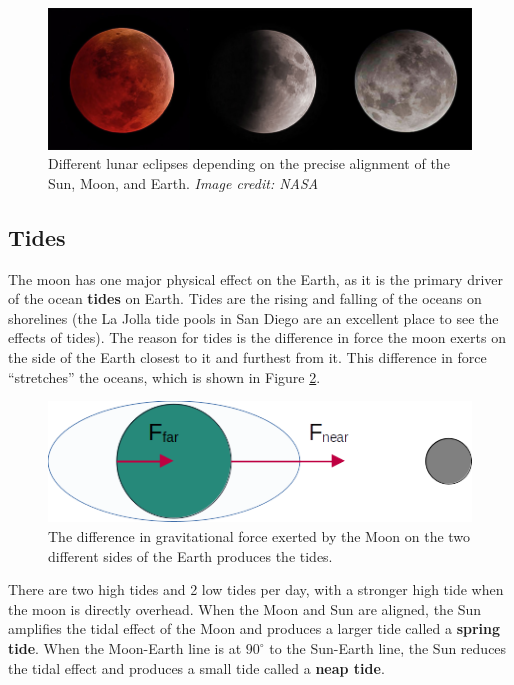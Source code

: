 \documentclass[12pt]{book}
\begin{document}
\begin{figure}[t]
\centering
\includegraphics[scale=0.4]{lunar_eclipse.jpg}
\caption{Different lunar eclipses depending on the precise alignment of the Sun, Moon, and Earth. \textit{Image credit: NASA}}
\label{lunareclipse}
\end{figure}

\subsection{Tides}

The moon has one major physical effect on the Earth, as it is the primary driver of the ocean \textbf{tides} on Earth. Tides are the rising and falling of the oceans on shorelines (the La Jolla tide pools in San Diego are an excellent place to see the effects of tides). The reason for tides is the difference in force the moon exerts on the side of the Earth closest to it and furthest from it. This difference in force ``stretches'' the oceans, which is shown in Figure \ref{tides}.

\begin{figure}[H]
\centering
\includegraphics[scale=0.6]{tides.png}
\caption{The difference in gravitational force exerted by the Moon on the two different sides of the Earth produces the tides.}
\label{tides}
\end{figure}

There are two high tides and 2 low tides per day, with a stronger high tide when the moon is directly overhead. When the Moon and Sun are aligned, the Sun amplifies the tidal effect of the Moon and produces a larger tide called a \textbf{spring tide}. When the Moon-Earth line is at $90^{\circ}$ to the Sun-Earth line, the Sun reduces the tidal effect and produces a small tide called a \textbf{neap tide}.
\end{document}
